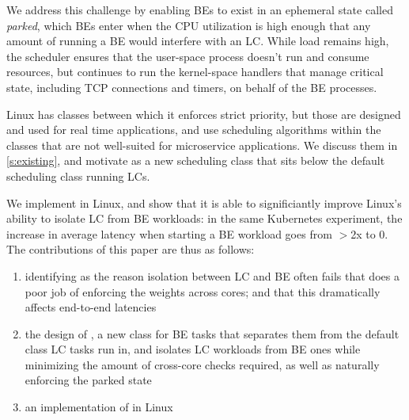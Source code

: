 We address this challenge by enabling BEs to exist in an ephemeral state called
\textit{parked}, which BEs enter when the CPU utilization is high enough that
any amount of running a BE would interfere with an LC. While load remains high,
the scheduler ensures that the user-space process doesn't run and consume
resources, but continues to run the kernel-space handlers that manage critical
state, including TCP connections and timers, on behalf of the BE processes. 

Linux has classes between which it enforces strict priority, but those are
designed and used for real time applications, and use scheduling algorithms
within the classes that are not well-suited for microservice applications. We
discuss them in \autoref{s:existing}, and motivate \beclass{} as a new
scheduling class that sits below the default scheduling class running LCs.

We implement \beclass{} in Linux, and show that it is able to significiantly
improve Linux's ability to isolate LC from BE workloads: in the same Kubernetes
experiment, the increase in average latency when starting a BE workload goes
from $>$2x to 0. The contributions of this paper are thus as follows: 
\begin{enumerate}
    \item identifying as the reason isolation between LC and BE often fails that
    \cgroups{} does a poor job of enforcing the weights across cores; and that
    this dramatically affects end-to-end latencies
    \item the design of \beclass{}, a new class for BE tasks that separates
    them from the default class LC tasks run in, and isolates LC workloads from
    BE ones while minimizing the amount of cross-core checks required, as well as
    naturally enforcing the parked state
    \item an implementation of \beclass{} in Linux
\end{enumerate}
